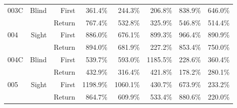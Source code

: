 \begin{table}[!htb]
\begin{tabular}{lrrrrrrl}
003C & Blind & First &   361.4\% &   244.3\% &                                               206.8\% &                                                838.9\% &   646.0\% \\
    &       & Return &   767.4\% &   532.8\% &                                               325.9\% &                                                546.8\% &   514.4\% \\
004 & Sight & First &   886.0\% &   676.1\% &                                               899.3\% &                                                966.4\% &   890.9\% \\
    &       & Return &   894.0\% &   681.9\% &                                               227.2\% &                                                853.4\% &   750.0\% \\
004C & Blind & First &   539.7\% &   593.0\% &                                              1185.5\% &                                                228.6\% &   360.4\% \\
    &       & Return &   432.9\% &   316.4\% &                                               421.8\% &                                                178.2\% &   280.1\% \\
005 & Sight & First &  1198.9\% &  1060.1\% &                                               430.7\% &                                                673.9\% &   233.2\% \\
    &       & Return &   864.7\% &   609.9\% &                                               533.4\% &                                                880.6\% &   220.0\% \\
\bottomrule
\end{tabular}
\end{table}


